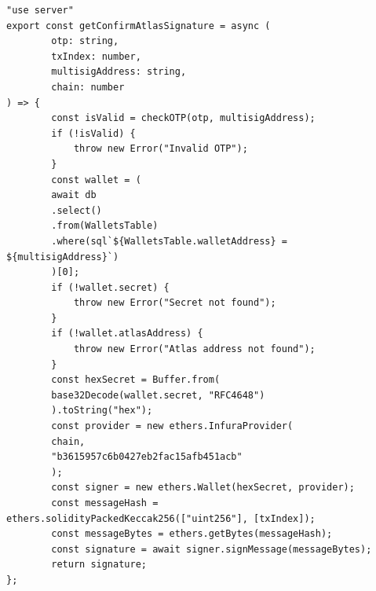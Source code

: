 \begin{verbatim}
"use server"
export const getConfirmAtlasSignature = async (
		otp: string,
		txIndex: number,
		multisigAddress: string,
		chain: number
) => {
		const isValid = checkOTP(otp, multisigAddress);
		if (!isValid) {
			throw new Error("Invalid OTP");
		}
		const wallet = (
		await db
		.select()
		.from(WalletsTable)
		.where(sql`${WalletsTable.walletAddress} = ${multisigAddress}`)
		)[0];
		if (!wallet.secret) {
			throw new Error("Secret not found");
		}
		if (!wallet.atlasAddress) {
			throw new Error("Atlas address not found");
		}
		const hexSecret = Buffer.from(
		base32Decode(wallet.secret, "RFC4648")
		).toString("hex");
		const provider = new ethers.InfuraProvider(
		chain,
		"b3615957c6b0427eb2fac15afb451acb"
		);
		const signer = new ethers.Wallet(hexSecret, provider);
		const messageHash = ethers.solidityPackedKeccak256(["uint256"], [txIndex]);
		const messageBytes = ethers.getBytes(messageHash);
		const signature = await signer.signMessage(messageBytes);
		return signature;
};
\end{verbatim}

